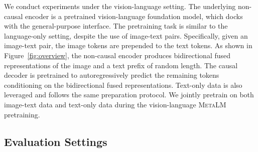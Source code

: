 \documentclass{article}
\theoremstyle{plain}
\theoremstyle{definition}
\theoremstyle{remark}
\newcommand\ours{\textsc{MetaLM}}
\begin{document}
We conduct experiments under the vision-language setting.
The underlying non-causal encoder is a pretrained vision-language foundation model, which docks with the general-purpose interface.
The pretraining task is similar to the language-only setting, despite the use of image-text pairs.
Specifically, given an image-text pair, the image tokens are prepended to the text tokens.
As shown in Figure~\ref{fig:overview}, the non-causal encoder produces bidirectional fused representations of the image and a text prefix of random length.
The causal decoder is pretrained to autoregressively predict the remaining tokens conditioning on the bidirectional fused representations.
Text-only data is also leveraged and follows the same preparation protocol.
We jointly pretrain on both image-text data and text-only data during the vision-language \ours{} pretraining.


\subsection{Evaluation Settings}
\label{sec:vl:eval}


\begin{table}[t]
\centering
{}
\caption{Evaluation summary of the vision-language datasets. 
We evaluate the capabilities of zero-shot, in-context learning, and finetuning.
}
\label{tab:vl:demo-capability}
\end{table}
\end{document}
